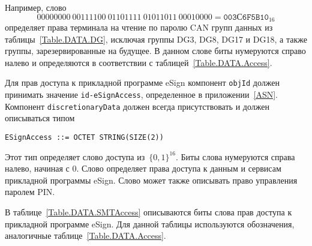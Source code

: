 Например, слово 
$$
00000000\ 00111100\ 01101111\ 01011011\ 00010000 = \texttt{003С6F5B10}_{16}
$$ 
определяет права терминала на чтение по паролю CAN 
групп данных из таблицы~\ref{Table.DATA.DG}, исключая группы DG3, DG8, DG17 и DG18,
а также группы, зарезервированные на будущее.
В данном слове биты нумеруются справо налево и определяются в соответствии
с таблицей~\ref{Table.DATA.Access}.

Для прав доступа к прикладной программе eSign компонент \verb|objId| должен принимать 
значение \verb|id-eSignAccess|, определенное в приложении~\ref{ASN}. Компонент 
\verb|discretionaryData| должен всегда присутствовать и должен описываться типом  


\begin{verbatim}
ESignAccess ::= OCTET STRING(SIZE(2))
\end{verbatim}

Этот тип определяет слово доступа из~$\{0,1\}^{16}$. 
Биты слова нумеруются справа налево, начиная с 0. 
Слово определяет права доступа к данным и сервисам прикладной программы eSign.
Слово может также описывать право управления паролем PIN. 

В таблице~\ref{Table.DATA.SMTAccess} описываются биты слова прав доступа
к прикладной программе eSign. Для данной таблицы используются обозначения,
аналогичные таблице~\ref{Table.DATA.Access}.


